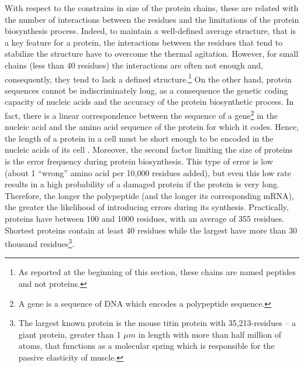 With respect to the constrains in size of the protein chains, these are related with the number of interactions between the residues and the limitations of the protein biosynthesis process.
Indeed, to maintain a well-defined average structure, that is a key feature for a protein, the interactions between the residues that tend to stabilize the structure have to overcome the thermal agitation. However, for small chains (less than 40 residues) the interactions are often not enough and, consequently, they tend to lack a defined structure.\footnote{As reported at the beginning of this section, these chains are named peptides and not proteins.}%
On the other hand, protein sequences cannot be indiscriminately long, as a consequence the genetic coding capacity of nucleic acids and the accuracy of the protein biosynthetic process. In fact, there is a linear correspondence between the sequence of a gene\footnote{A gene is a sequence of DNA which encodes a polypeptide sequence.} in the nucleic acid and the amino acid sequence of the protein for which it codes. Hence, the length of a protein in a cell must be short enough to be encoded in the nucleic acids of its cell \cite{nelson2008lehninger}. Moreover, the second factor limiting the size of proteins is the error frequency during protein biosynthesis. This type of error is low (about 1 ``wrong'' amino acid per 10,000 residues added), but even this low rate results in a high probability of a damaged protein if the protein is very long. Therefore, the longer the polypeptide (and the longer its corresponding mRNA), the greater the likelihood of introducing errors during its synthesis. 
Practically, proteins have between 100 and 1000 residues, with an average of 355 residues. Shortest proteins contain at least 40 residues while the largest have more than 30 thousand residues\footnote{The largest known protein is the mouse titin protein with 35,213-residues -- a giant protein, greater than 1 $\mu m$ in length with more than half million of atoms, that functions as a molecular spring which is responsible for the passive elasticity of muscle.}.

